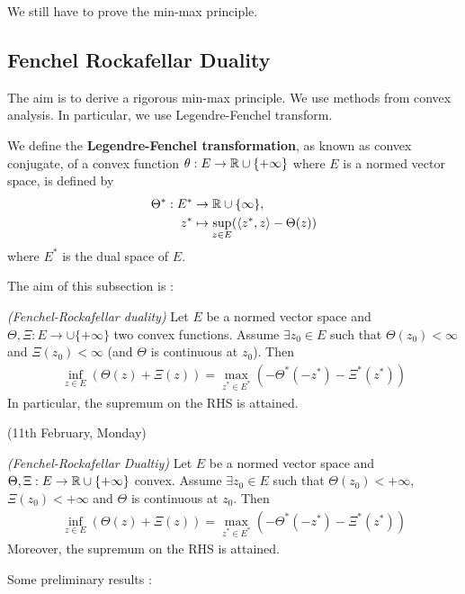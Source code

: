 \documentclass[12pt,a4paper]{article}
\begin{document}
We still have to prove the min-max principle.

\subsection{Fenchel Rockafellar Duality}

The aim is to derive a rigorous min-max principle. We use methods from convex analysis. In particular, we use Legendre-Fenchel transform.
\s

 We define the \textbf{Legendre-Fenchel transformation}, as known as convex conjugate, of a convex function $\theta : E\rightarrow \mathbb{R} \cup \{+\infty \}$ where $E$ is a normed vector space, is defined by
\begin{align*}
\Theta^* : E^* &\rightarrow \mathbb{R} \cup \{\infty \},\\
z^* &\mapsto \sup_{z\in E}(\langle z^*, z\rangle - \Theta(z))
\end{align*}
where $E^*$ is the dual space of $E$.
\s

The aim of this subsection is : 
\s

 \emph{(Fenchel-Rockafellar duality)} Let $E$ be a normed vector space and $\Theta, \Xi : E\rightarrow \cup \{+ \infty \}$ two convex functions. Assume $\exists z_0 \in E$ such that $\Theta(z_0) < \infty$ and $\Xi(z_0) < \infty$ (and $\Theta$ is continuous at $z_0$). Then
\begin{align*}
\inf_{z\in E} (\Theta(z) + \Xi(z)) = \max_{z^*\in E^*} (-\Theta^*(-z^*) - \Xi^*(z^*))
\end{align*}
In particular, the supremum on the RHS is attained. 
\s

\newday

(11th February, Monday)
\s

 \emph{(Fenchel-Rockafellar Dualtiy)} Let $E$ be a normed vector space and $\Theta, \Xi : E\rightarrow \mathbb{R} \cup \{+ \infty \}$ convex. Assume $\exists z_0 \in E$ such that $\Theta(z_0 )< + \infty$, $\Xi(z_0) < +\infty$ and $\Theta$ is continuous at $z_0$. Then
\begin{align*}
\inf_{z\in E} (\Theta (z) + \Xi(z)) = \max_{z^* \in E^*} (- \Theta^*(-z^*) - \Xi^*(z^*)) 
\end{align*}
Moreover, the supremum on the RHS is attained.
\s

Some preliminary results : 
\s
\end{document}
